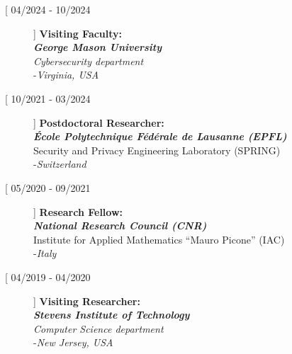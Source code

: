 \documentclass[10pt]{article} %
\begin{document}
\begin{description}
\item[[ {04/2024 - 10/2024}]] \textbf{Visiting Faculty:}\\
 \textbf{\textit{George Mason University}}\\\textit{Cybersecurity department}\\
 -\textit{Virginia, USA}



\item[[ {10/2021 - 03/2024}]] \textbf{Postdoctoral Researcher:}\\
 \textbf{\textit{École Polytechnique Fédérale de Lausanne (EPFL)}}\\ 
Security and Privacy Engineering Laboratory (SPRING)\\
-\textit{Switzerland}
\item[[ 05/2020 - 09/2021]] \textbf{Research Fellow:}\\
 \textbf{\textit{National Research Council (CNR)}}\\
Institute for Applied Mathematics ``Mauro Picone'' (IAC)\\
-\textit{Italy}
\item[[ 04/2019 - 04/2020]] \textbf{Visiting Researcher:}\\
 \textbf{\textit{Stevens Institute of Technology}}\\\textit{Computer Science department}\\ 
-\textit{New Jersey, USA}

\end{description}
\end{document}
